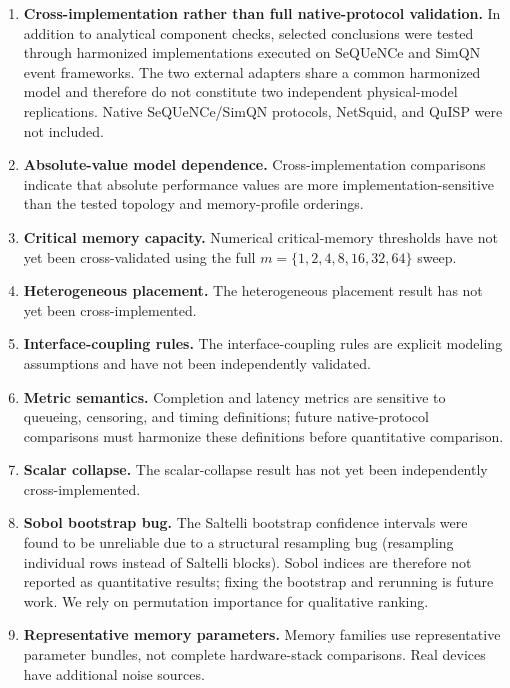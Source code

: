 \documentclass[quantumrep,article,submit,moreauthors]{Definitions/mdpi}
\begin{document}
\begin{enumerate}[leftmargin=2em]
\item \textbf{Cross-implementation rather than full native-protocol validation.} In addition to analytical component checks, selected conclusions were tested through harmonized implementations executed on SeQUeNCe and SimQN event frameworks. The two external adapters share a common harmonized model and therefore do not constitute two independent physical-model replications. Native SeQUeNCe/SimQN protocols, NetSquid, and QuISP were not included.

\item \textbf{Absolute-value model dependence.} Cross-implementation comparisons indicate that absolute performance values are more implementation-sensitive than the tested topology and memory-profile orderings.

\item \textbf{Critical memory capacity.} Numerical critical-memory thresholds have not yet been cross-validated using the full $m=\{1,2,4,8,16,32,64\}$ sweep.

\item \textbf{Heterogeneous placement.} The heterogeneous placement result has not yet been cross-implemented.

\item \textbf{Interface-coupling rules.} The interface-coupling rules are explicit modeling assumptions and have not been independently validated.

\item \textbf{Metric semantics.} Completion and latency metrics are sensitive to queueing, censoring, and timing definitions; future native-protocol comparisons must harmonize these definitions before quantitative comparison.

\item \textbf{Scalar collapse.} The scalar-collapse result has not yet been independently cross-implemented.

\item \textbf{Sobol bootstrap bug.} The Saltelli bootstrap confidence intervals were found to be unreliable due to a structural resampling bug (resampling individual rows instead of Saltelli blocks). Sobol indices are therefore not reported as quantitative results; fixing the bootstrap and rerunning is future work. We rely on permutation importance for qualitative ranking.

\item \textbf{Representative memory parameters.} Memory families use representative parameter bundles, not complete hardware-stack comparisons. Real devices have additional noise sources.


\end{enumerate}
\end{document}
